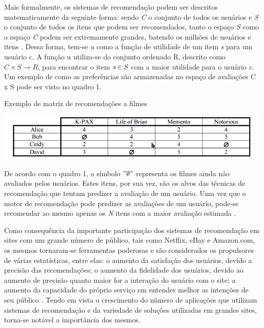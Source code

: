 Mais formalmente, os sistemas de recomendação podem ser descritos matematicamente da seguinte forma: sendo \emph{C} o conjunto de todos os usuários e \emph{S} o conjunto de todos os itens que podem ser recomendados, tanto o espaço \emph{S} como o espaço \emph{C} podem ser extremamente grandes, batendo os milhões de usuários e itens \cite{adomavicius2005toward, gomez2016netflix}. Dessa forma, tem-se \textit{u} como a função de utilidade de um item \emph{s} para um usuário c. A função u utiliza-se do conjunto ordenado R, descrito como $C \times S \rightarrow R$, para encontrar o item $\emph{s} \in \emph{S}$ com a maior utilidade para o usuário \emph{c}. Um exemplo de como as preferências são armazenadas no espaço de avaliações C x S pode ser visto no quadro 1.

\begin{quadro}[h!tp]
	\caption{\label{movie_matrix}Exemplo de matriz de recomendações a filmes}
	\begin{center}
		\includegraphics[scale=0.8]{images/movie_matrix.png}
	\end{center}
\end{quadro}

De acordo com o quadro 1, o símbolo $"\emptyset"$ representa os filmes ainda não avaliados pelos usuários. Estes itens, por sua vez, são os alvos das técnicas de recomendação que tentam predizer a avaliação de um usuário. Uma vez que o motor de recomendação pode predizer as avaliações de um usuário, pode-se recomendar ao mesmo apenas os \emph{N} itens com a maior avaliação estimada \cite{adomavicius2005toward}.

Como consequência da importante participação dos sistemas de recomendação em sites com um grande número de público, tais como Netflix, eBay e Amazon.com, os mesmos tornaram-se ferramentas poderosas \cite{schafer1999recommender} e são considerados os propulsores de várias estatísticas, entre elas: o aumento da satisfação dos usuários, devido a precisão das recomendações; o aumento da fidelidade dos usuários, devido ao aumento de precisão quanto maior for a interação do usuário com o site; a aumento da capacidade do próprio serviço em entender melhor as intenções de seu público \cite{ricci2011introduction}. Tendo em vista o crescimento do número de aplicações que utilizam sistemas de recomendação e da variedade de soluções utilizadas em grandes sites, torna-se notável a importância dos mesmos.

